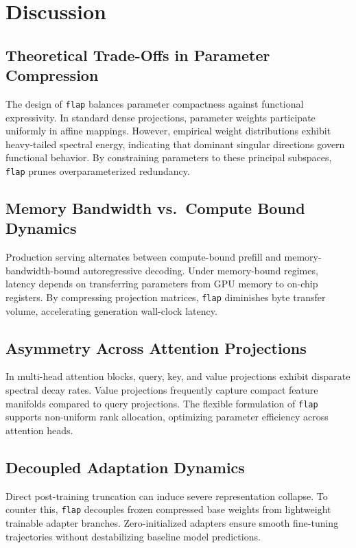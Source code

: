 \section{Discussion}

\subsection{Theoretical Trade-Offs in Parameter Compression}
The design of \texttt{flap} balances parameter compactness against functional expressivity. In standard dense projections, parameter weights participate uniformly in affine mappings. However, empirical weight distributions exhibit heavy-tailed spectral energy, indicating that dominant singular directions govern functional behavior. By constraining parameters to these principal subspaces, \texttt{flap} prunes overparameterized redundancy.

\subsection{Memory Bandwidth vs.\ Compute Bound Dynamics}
Production serving alternates between compute-bound prefill and memory-bandwidth-bound autoregressive decoding. Under memory-bound regimes, latency depends on transferring parameters from GPU memory to on-chip registers. By compressing projection matrices, \texttt{flap} diminishes byte transfer volume, accelerating generation wall-clock latency.

\subsection{Asymmetry Across Attention Projections}
In multi-head attention blocks, query, key, and value projections exhibit disparate spectral decay rates. Value projections frequently capture compact feature manifolds compared to query projections. The flexible formulation of \texttt{flap} supports non-uniform rank allocation, optimizing parameter efficiency across attention heads.

\subsection{Decoupled Adaptation Dynamics}
Direct post-training truncation can induce severe representation collapse. To counter this, \texttt{flap} decouples frozen compressed base weights from lightweight trainable adapter branches. Zero-initialized adapters ensure smooth fine-tuning trajectories without destabilizing baseline model predictions.

